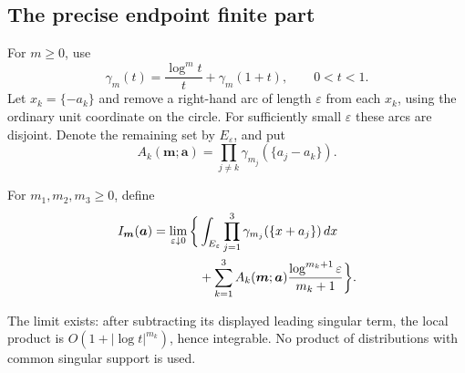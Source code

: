 \subsection{The precise endpoint finite part}

For $m\ge0$, use
\begin{equation}\label{eq:gamma-local}
 \gamma_m(t)=\frac{\log^m t}{t}+\gamma_m(1+t),\qquad 0<t<1.
\end{equation}
Let $x_k=\{-a_k\}$ and remove a right-hand arc of length $\varepsilon$
from each $x_k$, using the ordinary unit coordinate on the circle.
For sufficiently small $\varepsilon$ these arcs are disjoint.  Denote
the remaining set by $E_\varepsilon$, and put
\[
 A_k(\boldsymbol m;\boldsymbol a)
 =\prod_{j\ne k}\gamma_{m_j}(\{a_j-a_k\}).
\]

\begin{definition}\label{def:triplefp}
For $m_1,m_2,m_3\ge0$, define
\begin{align}\label{eq:triplefp}
 I_{\boldsymbol m}(\boldsymbol a)
 =\lim_{\varepsilon\downarrow0}\bigg\{
 &\int_{E_\varepsilon}\prod_{j=1}^{3}
      \gamma_{m_j}(\{x+a_j\})\,dx\notag\\
 &+\sum_{k=1}^{3}
 A_k(\boldsymbol m;\boldsymbol a)
       \frac{\log^{m_k+1}\varepsilon}{m_k+1}\bigg\}.
\end{align}
\end{definition}
The limit exists: after subtracting its displayed leading singular term,
the local product is $O(1+|\log t|^{m_k})$, hence integrable.  No product
of distributions with common singular support is used.


